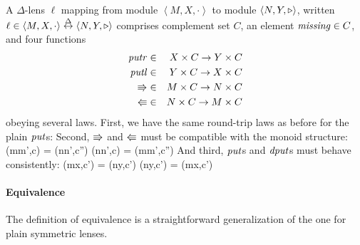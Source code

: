 \begin{defn}[$R$-similarity]
\begin{theorem}
\begin{lemma}
\begin{theorem}[No products]
\begin{lemma}
\begin{defn}
\begin{theorem}
\begin{theorem}
\begin{corollary}[Hylomorphism]
\begin{defn}
\begin{defn}
\begin{defn}[Symmetrization]
\begin{theorem}
\begin{defn}
A $\Delta$-lens $\ell$ mapping from module
        $\left<M,X,\cdot\right>$ to module $\left<N,Y,\triangleright\right>$, 
        written $\ell \in \left<M,X,\cdot\right> \overset{\Delta}{\leftrightarrow}
        \left<N,Y,\triangleright\right>$ comprises complement set
        $C$, an element 
        $\mathit{missing} \in C$, and four functions
        \begin{eqnarray*}
            \mathit{putr}  &\in& X \times C \to Y \times C \\
            \mathit{putl}  &\in& Y \times C \to X \times C \\
            \mathord{\Rrightarrow} &\in& M \times C \to N \times C \\
            \mathord{\Lleftarrow} &\in& N \times C \to M \times C
        \end{eqnarray*}
obeying several laws.  
%
First, we have the same round-trip laws as before for the plain $\mathit{put}$s:
%
%
Second, $\mathord{\Rrightarrow}$ and $\mathord{\Lleftarrow}$ must be compatible with the monoid structure:
%
    {\dputr(mm',c) = (nn',c'')}
    {\dputl(nn',c) = (mm',c'')}
%
And third, $\mathit{put}$s and $\mathit{dput}$s must behave consistently:
        {\putr(mx,c') = (ny,c')}
        {\putl(ny,c') = (mx,c')}
\end{defn}


\paragraph*{Equivalence} The definition of equivalence is a straightforward
generalization of the one for plain symmetric lenses.


\end{theorem}
\end{defn}
\end{defn}
\end{defn}
\end{corollary}
\end{theorem}
\end{theorem}
\end{defn}
\end{lemma}
\end{theorem}
\end{lemma}
\end{theorem}
\end{defn}
